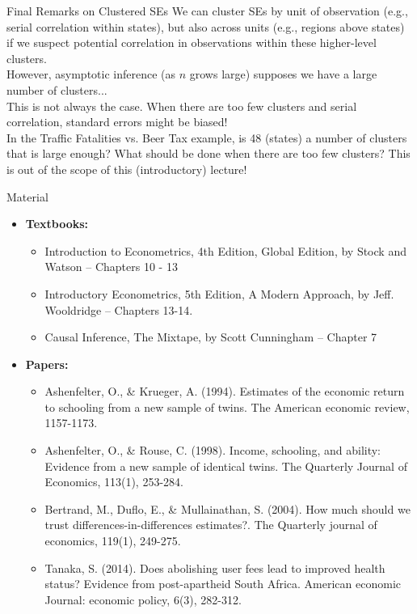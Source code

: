 \documentclass[notes,10pt, aspectratio=169]{beamer}
\begin{document}
\begin{frame}{Final Remarks on Clustered SEs}
We can cluster SEs by unit of observation (e.g., serial correlation within states), but also across units (e.g., regions above states) if we suspect potential correlation in observations within these higher-level clusters.\\[1em]

However, asymptotic inference (as $n$ grows large) supposes we have a large number of clusters...\\[1em]%

This is not always the case. When there are too few clusters and serial correlation, standard errors might be biased!\\[1em]

In the Traffic Fatalities vs. Beer Tax example, is 48 (states) a number of clusters that is large enough? What should be done when there are too few clusters? This is out of the scope of this (introductory) lecture!
\end{frame}


\begin{frame}[allowframebreaks]{Material}
\begin{itemize}
    \item[--] \textbf{Textbooks:}
    \begin{itemize}
        \item Introduction to Econometrics, 4th Edition, Global Edition, by Stock and Watson -- Chapters 10 - 13
        \item Introductory Econometrics, 5th Edition, A Modern Approach, by Jeff. Wooldridge -- Chapters 13-14.
        \item Causal Inference, The Mixtape, by Scott Cunningham -- Chapter 7
    \end{itemize}
    \item[--] \textbf{Papers:}
    \begin{itemize}
        \item Ashenfelter, O., \& Krueger, A. (1994). Estimates of the economic return to schooling from a new sample of twins. The American economic review, 1157-1173.
        \item Ashenfelter, O., \& Rouse, C. (1998). Income, schooling, and ability: Evidence from a new sample of identical twins. The Quarterly Journal of Economics, 113(1), 253-284.
        \item Bertrand, M., Duflo, E., \& Mullainathan, S. (2004). How much should we trust differences-in-differences estimates?. The Quarterly journal of economics, 119(1), 249-275.
        \item Tanaka, S. (2014). Does abolishing user fees lead to improved health status? Evidence from post-apartheid South Africa. American economic Journal: economic policy, 6(3), 282-312.
    \end{itemize}
\end{itemize}
\scriptsize{

 
}
\end{frame}
\end{document}
